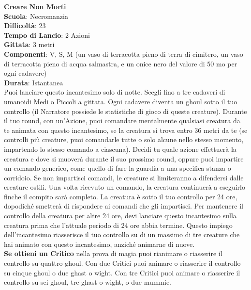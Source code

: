 \begin{multicols}{2}
\medskip\textbf{Creare Non Morti}\\
\textbf{Scuola}: Necromanzia\\
\textbf{Difficoltà}:  23\\
\textbf{Tempo di Lancio}: 2 Azioni\\
\textbf{Gittata}: 3 metri\\
\textbf{Componenti}: V, S, M (un vaso di terracotta pieno di terra di cimitero, un vaso di terracotta pieno di acqua salmastra, e un onice nero del valore di 50 mo per ogni cadavere)\\
\textbf{Durata}: Istantanea\\
Puoi lanciare questo incantesimo solo di notte. Scegli fino a tre cadaveri di umanoidi Medi o Piccoli a gittata. Ogni cadavere diventa un ghoul sotto il tuo controllo (il Narratore possiede le statistiche di gioco di queste creature). Durante il tuo round, con un'Azione, puoi comandare mentalmente qualsiasi creatura da te animata con questo incantesimo, se la creatura si trova entro 36 metri da te (se controlli più creature, puoi comandarle tutte o solo alcune nello stesso momento, impartendo lo stesso comando a ciascuna). Decidi tu quale azione effettuerà la creatura e dove si muoverà durante il suo prossimo round, oppure puoi impartire un comando generico, come quello di fare la guardia a una specifica stanza o corridoio. Se non impartisci comandi, le creature si limiteranno a difendersi dalle creature ostili. Una volta ricevuto un comando, la creatura continuerà a eseguirlo finche il compito sarà completo. La creatura è sotto il tuo controllo per 24 ore, dopodiché smetterà di rispondere ai comandi che gli impartisci. Per mantenere il controllo della creatura per altre 24 ore, devi lanciare questo incantesimo sulla creatura prima che l’attuale periodo di 24 ore abbia termine. Questo impiego dell'incantesimo riasserisce il tuo controllo su di un massimo di tre creature che hai animato con questo incantesimo, anziché animarne di nuove.\\
\textbf{Se ottieni un Critico} nella prova di magia puoi rianimare o riasserire il controllo su quattro ghoul. Con due Critici puoi animare o riasserire il controllo su cinque
ghoul o due ghast o wight. Con tre Critici puoi animare o riasserire il controllo su sei ghoul, tre ghast o wight, o due mummie. 


\end{multicols}

